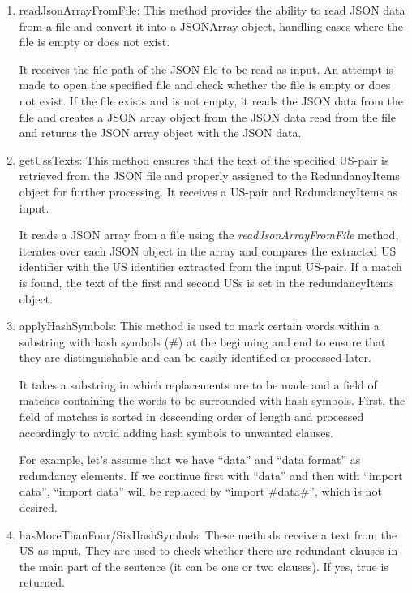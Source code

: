 \begin{enumerate}
	\item readJsonArrayFromFile: This method provides the ability to read JSON data from a file and convert it into a JSONArray object, handling cases where the file is empty or does not exist.

	It receives the file path of the JSON file to be read as input. An attempt is made to open the specified file and check whether the file is empty or does not exist. If the file exists and is not empty, it reads the JSON data from the file and creates a JSON array object from the JSON data read from the file and returns the JSON array object with the JSON data.
	
	\item getUssTexts: This method ensures that the text of the specified US-pair is retrieved from the JSON file and properly assigned to the RedundancyItems object for further processing. It receives a US-pair and RedundancyItems as input. 
	
	It reads a JSON array from a file using the \textit{readJsonArrayFromFile} method, iterates over each JSON object in the array and compares the extracted US identifier with the US identifier extracted from the input US-pair. If a match is found, the text of the first and second USs is set in the redundancyItems object.
	
	\item applyHashSymbols: This method is used to mark certain words within a substring with hash symbols (\#) at the beginning and end to ensure that they are distinguishable and can be easily identified or processed later. 
	
	It takes a substring in which replacements are to be made and a field of matches containing the words to be surrounded with hash symbols. First, the field of matches is sorted in descending order of length and processed accordingly to avoid adding hash symbols to unwanted clauses. 
	
	For example, let's assume that we have \enquote{data} and \enquote{data format} as redundancy elements. If we continue first with \enquote{data} and then with \enquote{import data}, \enquote{import data} will be replaced by \enquote{import \#data\#}, which is not desired.
	
	\item hasMoreThanFour/SixHashSymbols: These methods receive a text from the US as input. They are used to check whether there are redundant clauses in the main part of the sentence (it can be one or two clauses). If yes, true is returned.
	

\end{enumerate}
